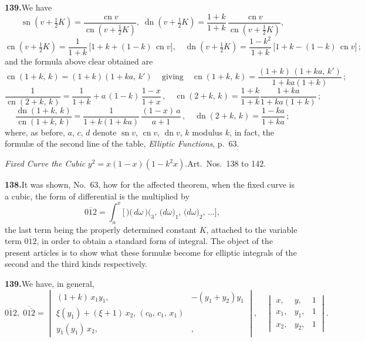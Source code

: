 \documentclass[11pt,a4paper]{article}
\DeclareMathOperator{\sn}{sn}
\DeclareMathOperator{\cn}{cn}
\DeclareMathOperator{\dn}{dn}
\begin{document}
\medskip\noindent\textbf{139.}\quad We have
\[
\sn(v + \tfrac{1}{2}K) = \frac{\cn v}{\cn(v + \tfrac{1}{2}K)},\;\dn(v + \tfrac{1}{2}K) = \frac{1 + k}{1 + k}\,\frac{\cn v}{\cn(v + \tfrac{1}{2}K)},
\]
\[
\cn(v + \tfrac{1}{2}K) = \frac{1}{1 + k}\,\bigl[1 + k + (1 - k)\,\cn v\bigr],\quad \dn(v + \tfrac{1}{2}K) = \frac{1 - k^2}{1 + k}\,\bigl[1 + k - (1 - k)\,\cn v\bigr]\,;
\]
and the formula above clear obtained are
\[
\cn(1 + k,\,k) = (1 + k)(1 + ka,\,k')\,\quad\text{giving}\quad \cn(1 + k,\,k) = \frac{(1 + k)\,(1 + ka,\,k')}{1 + ka(1 + k)}\,;
\]
\[
\frac{1}{\cn(2 + k,\,k)} = \frac{1}{1 + k} + a\,(1 - k)\,\frac{1 - x}{1 + x}\,,\quad \cn(2 + k,\,k) = \frac{1 + k}{1 + k}\frac{1 + ka}{1 + ka(1 + k)}\,;
\]
\[
\frac{\dn(1 + k,\,k)}{\cn(1 + k,\,k)} = \frac{1}{1 + k(1 + ka)}\,\frac{(1 - x)\,a}{a + 1}\,,\quad \dn(2 + k,\,k) = \frac{1 - ka}{1 + ka}\,;
\]
where, as before, $a$, $c$, $d$ denote $\sn v$, $\cn v$, $\dn v$, $k$ modulus $k$, in fact, the formul\ae{} of the second line of the table, \textit{Elliptic Functions}, p.\ $63$.

\medskip\noindent\textit{Fixed Curve the Cubic} $y^2 = x(1 - x)(1 - k^2 x)$.\quad Art.\ Nos.\ 138 to 142.

\medskip\noindent\textbf{138.}\quad It was shown, No.\ 63, how for the affected theorem, when the fixed curve is a cubic, the form of differential is the multiplied by
\[
\overline{012} = \int_a^x \bigl[\!\,\mbox{$)\!($}\,d\omega\,\mbox{$)\!($}_3,\,\bigl(d\omega\bigr)_1,\,\bigl(d\omega\bigr)_2,\,\ldots\!\bigr],
\]
the last term being the properly determined constant $K$, attached to the variable term $\overline{012}$, in order to obtain a standard form of integral. The object of the present articles is to show what these formul\ae{} become for elliptic integrals of the second and the third kinds respectively.

\medskip\noindent\textbf{139.}\quad We have, in general,
\[
\overline{012},\;\overline{0\overline{12}} = \begin{vmatrix}
(1 + k)\,x_1y_1, & -(y_1 + y_2)y_1\\
\xi(y_1) + (\xi + 1)\,x_2,\,(c_0,\,c_1,\,x_1)\\
y_1(y_1)\,x_2, & ,
\end{vmatrix},\quad\begin{vmatrix} x, & y, & 1\\ x_1, & y_1, & 1\\ x_2, & y_2, & 1 \end{vmatrix}.
\]
\end{document}
